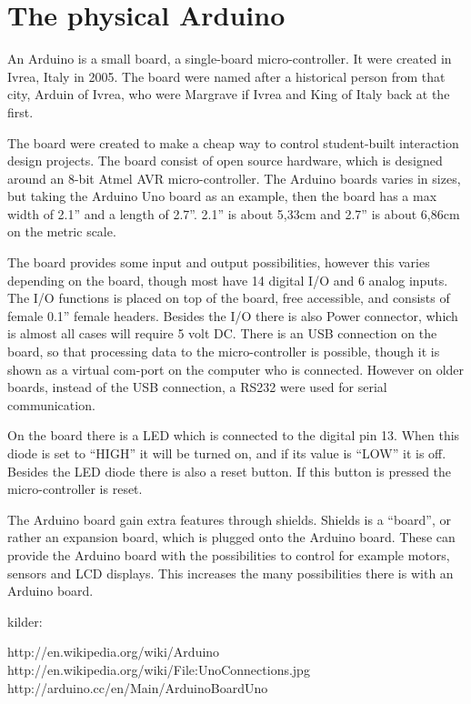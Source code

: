 
\section{The physical Arduino}
An Arduino is a small board, a single-board micro-controller. It were created in Ivrea, Italy in 2005. The board were named after a historical person from that city, Arduin of Ivrea, who were Margrave if Ivrea and King of Italy back at the first. 

The board were created to make a cheap way to control student-built interaction design projects. The board consist of open source hardware, which is designed around an 8-bit Atmel AVR micro-controller. The Arduino boards varies in sizes, but taking the Arduino Uno board as an example, then the board has a max width of 2.1'' and a length of 2.7''. 2.1'' is about 5,33cm and 2.7'' is about 6,86cm on the metric scale. 

The board provides some input and output possibilities, however this varies depending on the board, though most have 14 digital I/O and 6 analog inputs. The I/O functions is placed on top of the board, free accessible, and consists of female 0.1'' female headers. Besides the I/O there is also Power connector, which is almost all cases will require 5 volt DC. There is an USB connection on the board, so that processing data to the micro-controller is possible, though it is shown as a virtual com-port on the computer who is connected. However on older boards, instead of the USB connection, a RS232 were used for serial communication. 

On the board there is a LED which is connected to the digital pin 13. When this diode is set to ``HIGH'' it will be turned on, and if its value is ``LOW'' it is off. Besides the LED diode there is also a reset button. If this button is pressed the micro-controller is reset. 

The Arduino board gain extra features through shields. Shields is a ``board'', or rather an expansion board, which is plugged onto the Arduino board. These can provide the Arduino board with the possibilities to control for example motors, sensors and LCD displays. This increases the many possibilities there is with an Arduino board. 

kilder:

http://en.wikipedia.org/wiki/Arduino
http://en.wikipedia.org/wiki/File:UnoConnections.jpg
http://arduino.cc/en/Main/ArduinoBoardUno
